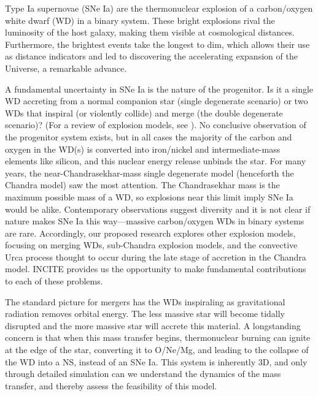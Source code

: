 Type Ia supernovae (SNe Ia) are the thermonuclear explosion of a
carbon/oxygen white dwarf (WD) in a binary system.  These bright
explosions rival the luminosity of the host galaxy, making them
visible at cosmological distances. Furthermore, the
brightest events take the longest to dim, which allows their use as
distance indicators and led to discovering the accelerating
expansion of the Universe, a remarkable advance.

A fundamental uncertainty in SNe Ia is the nature
of the progenitor. Is it a single WD accreting from a normal companion star
(single degenerate scenario) or two WDs that inspiral (or
violently collide) and merge (the double degenerate scenario)? (For a
review of explosion models, see \cite{calder:2013}).  No conclusive
observation of the progenitor system exists, but in all cases
the majority of the carbon and oxygen in the WD(s) is converted into
iron/nickel and intermediate-mass elements like silicon, and this
nuclear energy release unbinds the star.
For many years, the near-Chandrasekhar-mass single degenerate model
(henceforth the Chandra model) saw the most attention.  The
Chandrasekhar mass is the maximum possible mass of a WD, so
explosions near this limit imply SNe Ia would be alike.  Contemporary
observations suggest diversity and it is not clear if nature makes SNe
Ia this way---massive carbon/oxygen WDs in binary systems are rare.
Accordingly, our proposed research explores other explosion models,
focusing on merging WDs, sub-Chandra explosion models, and the convective
Urca process thought to occur during the late stage of accretion in the
Chandra model.  INCITE provides us the opportunity to make fundamental
contributions to each of these problems.

The standard picture for mergers has the WDs
inspiraling as gravitational radiation removes orbital energy.
The less massive star will become tidally disrupted and the more
massive star will accrete this material.  A longstanding concern is
that when this mass transfer begins, thermonuclear burning can ignite
at the edge of the star, converting it to O/Ne/Mg, and leading to the
collapse of the WD into a NS, instead of an SNe Ia.
This system is inherently 3D, and only through detailed simulation
can we understand the dynamics of the mass transfer, and thereby
assess the feasibility of this model.

